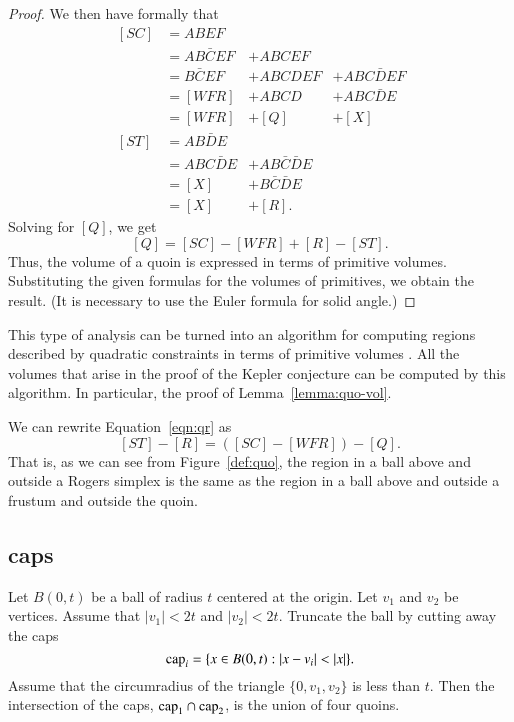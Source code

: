 \begin{proof}
We then have formally that
$$
\begin{array}{lllll} \,[SC] &=  A B E F \\
     &= A B \bar C E F &+ A B C E F\\
     &= B \bar C E F &+ A B C D E F &+ A B C \bar D E F\\
     &= [WFR] &+ A B C D &+ A B C \bar D E\\
     &= [WFR] &+ [Q] &+ [X]\\ 
     \,[ST] &= A B \bar D E\\
     &= A B C \bar D E &+ A B \bar C \bar D E\\
     &= [X] &+ B \bar C \bar D E\\
     &= [X] &+ [R].
\end{array}
$$
Solving for $[Q]$, we get
\begin{equation}\label{eqn:qr}
  [Q] = [SC] - [WFR] + [R] - [ST].
\end{equation}
Thus, the volume of a quoin is expressed in terms of primitive volumes.
Substituting the given formulas for the volumes of primitives, we obtain
the result.  (It is necessary to use the Euler formula for solid
angle.)
\end{proof}

\begin{remark}  This type of analysis can be turned into an algorithm
for computing regions described by quadratic constraints in terms
of primitive volumes \cite{quad}.  All the volumes that arise in the
proof of the Kepler conjecture can be computed by this algorithm.
In particular, the proof of Lemma~\ref{lemma:quo-vol}.
\end{remark}

\begin{remark}  We can rewrite Equation~\ref{eqn:qr} as
$$
  [ST]-[R] = ([SC]-[WFR]) - [Q].
$$
That is, as we can see from Figure~\ref{def:quo}, the region
in a ball above and outside a Rogers simplex is the same as the
region in a ball above and outside a frustum and outside the quoin.
\end{remark}



\subsection{caps}

\begin{lemma}\label{lemma:cap-rogers}
Let $B(0,t)$ be a ball of radius $t$ centered at the origin.  Let
$v_1$ and $v_2$ be vertices.  Assume that $|v_1|< 2t$ and $|v_2|<2
t$.  Truncate the ball by cutting away the caps
   $${\operatorname{cap}}_i = \{x\in B(0,t) :  |x- v_i| < |x|\}.$$
Assume that the circumradius of the triangle $\{0,v_1,v_2\}$ is
less than $t$. Then the intersection of the caps, ${\operatorname{cap}}_1\cap
{\operatorname{cap}}_2$, is the union of four quoins.
\end{lemma}

